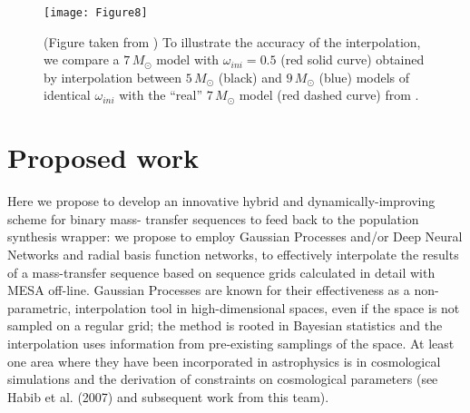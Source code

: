 \documentclass[preprint]{aastex}
\begin{document}
    
    
    
    
    
    

\begin{figure}
\begin{center}
\texttt{[image: Figure8]}
\caption{(Figure taken from \citet{2014A&A...566A..21G}) To illustrate the accuracy of the interpolation, we compare a $7\,M_\odot$ model with $\omega_{ini} = 0.5$ (red solid curve) obtained by interpolation between $5\,M_\odot$ (black) and $9\,M_\odot$ (blue) models of identical $\omega_{ini}$ with the ``real'' $7\,M_\odot$ model (red dashed curve) from \citet{Georgy:2013jp}.}
\end{center}
\end{figure}

\section{Proposed work}
    
Here we propose to develop an innovative hybrid and dynamically-improving scheme for binary mass- transfer sequences to feed back to the population synthesis wrapper: we propose to employ Gaussian Processes and/or Deep Neural Networks and radial basis function networks, to effectively interpolate the results of a mass-transfer sequence based on sequence grids calculated in detail with MESA \citep[a state-of-the-art stellar evolution code; ][]{Paxton2011,2013ApJS..208....4P,2015arXiv150603146P}  off-line. Gaussian Processes are known for their effectiveness as a non-parametric, interpolation tool in high-dimensional spaces, even if the space is not sampled on a regular grid; the method is rooted in Bayesian statistics and the interpolation uses information from pre-existing samplings of the space. At least one area where they have been incorporated in astrophysics is in cosmological simulations and the derivation of constraints on cosmological parameters (see Habib et al. (2007) and subsequent work from this team). 
    
\end{document}

